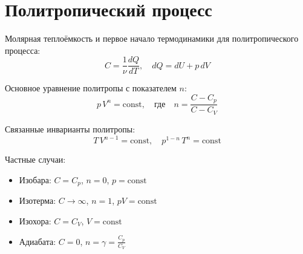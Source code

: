 \documentclass{article}
\begin{document}
\section*{Политропический процесс}

Молярная теплоёмкость и первое начало термодинамики для политропического процесса:
\[
C=\frac{1}{\nu}\frac{dQ}{dT}, \quad dQ=dU+p\,dV
\]

Основное уравнение политропы с показателем $n$:
\[
p\,V^n=\text{const}, \quad \text{где} \quad n=\frac{C-C_p}{C-C_V}
\]

Связанные инварианты политропы:
\[
T\,V^{n-1}=\text{const}, \quad p^{1-n}\,T^n=\text{const}
\]

Частные случаи:
\begin{itemize}
\item Изобара: $C=C_p$, $n=0$, $p=\text{const}$
\item Изотерма: $C\to\infty$, $n=1$, $pV=\text{const}$
\item Изохора: $C=C_V$, $V=\text{const}$
\item Адиабата: $C=0$, $n=\gamma=\frac{C_p}{C_V}$
\end{itemize}
\end{document}
